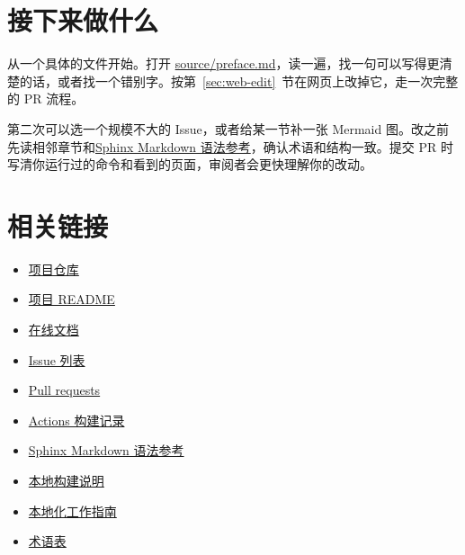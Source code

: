 \documentclass[UTF8,fontset=none,a4paper,11pt]{ctexart}
\newcommand{\code}[1]{{\CJKsetecglue{}\ttfamily #1}}
\begin{document}
\clearpage

\section{接下来做什么}\label{sec:next-steps}

从一个具体的文件开始。打开 \href{https://github.com/ulink-deep-learning-club/ulink-deeplearningclub-handouts/blob/main/source/preface.md}{\code{source/preface.md}}，读一遍，找一句可以写得更清楚的话，或者找一个错别字。按第~\ref{sec:web-edit}~节在网页上改掉它，走一次完整的 PR 流程。

第二次可以选一个规模不大的 Issue，或者给某一节补一张 Mermaid 图。改之前先读相邻章节和\href{https://github.com/ulink-deep-learning-club/ulink-deeplearningclub-handouts/blob/main/source/appendix/sphinx-guide/index.md}{Sphinx Markdown 语法参考}，确认术语和结构一致。提交 PR 时写清你运行过的命令和看到的页面，审阅者会更快理解你的改动。

\section{相关链接}\label{sec:links}

\begin{itemize}[leftmargin=1.8em,itemsep=2pt]
  \item \href{https://github.com/ulink-deep-learning-club/ulink-deeplearningclub-handouts}{项目仓库}
  \item \href{https://github.com/ulink-deep-learning-club/ulink-deeplearningclub-handouts/blob/main/README.md}{项目 README}
  \item \href{https://ulink-deep-learning-club.github.io/ulink-deeplearningclub-handouts/}{在线文档}
  \item \href{https://github.com/ulink-deep-learning-club/ulink-deeplearningclub-handouts/issues}{Issue 列表}
  \item \href{https://github.com/ulink-deep-learning-club/ulink-deeplearningclub-handouts/pulls}{Pull requests}
  \item \href{https://github.com/ulink-deep-learning-club/ulink-deeplearningclub-handouts/actions}{Actions 构建记录}
  \item \href{https://github.com/ulink-deep-learning-club/ulink-deeplearningclub-handouts/blob/main/source/appendix/sphinx-guide/index.md}{Sphinx Markdown 语法参考}
  \item \href{https://github.com/ulink-deep-learning-club/ulink-deeplearningclub-handouts/blob/main/source/appendix/build-docs.md}{本地构建说明}
  \item \href{https://github.com/ulink-deep-learning-club/ulink-deeplearningclub-handouts/blob/main/docs/i18n/AGENT_GUIDE.md}{本地化工作指南}
  \item \href{https://github.com/ulink-deep-learning-club/ulink-deeplearningclub-handouts/blob/main/docs/i18n/glossary.md}{术语表}
\end{itemize}
\end{document}
